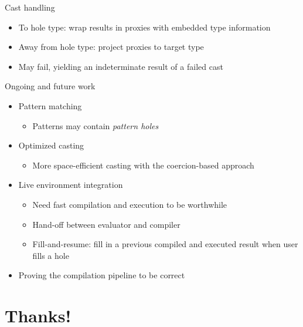 \documentclass[xcolor={dvipsnames},xtable]{beamer}
\begin{document}
\renewcommand{\currenttitle}{Cast handling}
\begin{frame}{\currenttitle}
  \begin{itemize}
    \item<+-> To hole type: wrap results in proxies with embedded type information
    \item<+-> Away from hole type: project proxies to target type
    \item<+-> May fail, yielding an indeterminate result of a failed cast
  \end{itemize}
  
  \vspace*{-1.5em}
\end{frame}

\renewcommand{\currenttitle}{Ongoing and future work}
\begin{frame}{\currenttitle}
  \begin{itemize}
    \item<+-> Pattern matching
      \begin{itemize}
        \item Patterns may contain \emph{pattern holes}
      \end{itemize}
    \item<+-> Optimized casting
      \begin{itemize}
        \item More space-efficient casting with the coercion-based approach
      \end{itemize}
    \item<+-> Live environment integration
      \begin{itemize}
        \item Need fast compilation and execution to be worthwhile
        \item Hand-off between evaluator and compiler
        \item Fill-and-resume: fill in a previous compiled and executed result when user fills a
          hole
      \end{itemize}
    \item<+-> Proving the compilation pipeline to be correct
  \end{itemize}
\end{frame}

\section*{Thanks!}
\end{document}
